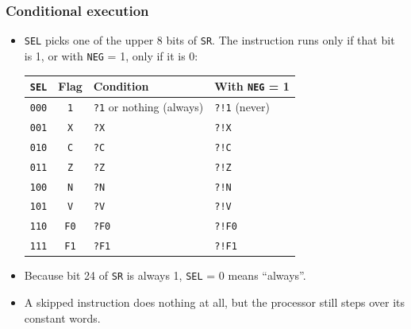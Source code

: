 \documentclass{beamer}
\newcommand{\code}[1]{\texttt{#1}}
\begin{document}
   \begin{frame}
    \frametitle{Conditional execution}
    \begin{itemize}
     \item \code{SEL} picks one of the upper 8 bits of \code{SR}.
      The instruction runs only if that bit is 1, or with \code{NEG} = 1,
      only if it is 0:
      {\small
      \begin{center}
       \begin{tabular}{|c|c|l|l|}
        \hline
         \code{SEL}&Flag&Condition&With \code{NEG} = 1\\
        \hline
         \code{000}&\code{1}&\code{?1} or nothing (always)&\code{?!1} (never)\\
         \code{001}&\code{X}&\code{?X}&\code{?!X}\\
         \code{010}&\code{C}&\code{?C}&\code{?!C}\\
         \code{011}&\code{Z}&\code{?Z}&\code{?!Z}\\
         \code{100}&\code{N}&\code{?N}&\code{?!N}\\
         \code{101}&\code{V}&\code{?V}&\code{?!V}\\
         \code{110}&\code{F0}&\code{?F0}&\code{?!F0}\\
         \code{111}&\code{F1}&\code{?F1}&\code{?!F1}\\
        \hline
       \end{tabular}
      \end{center}
      }
     \item Because bit 24 of \code{SR} is always 1, \code{SEL} = 0 means
      ``always''.
     \item A skipped instruction does nothing at all, but the processor
      still steps over its constant words.
    \end{itemize}
   \end{frame}
%
\end{document}

